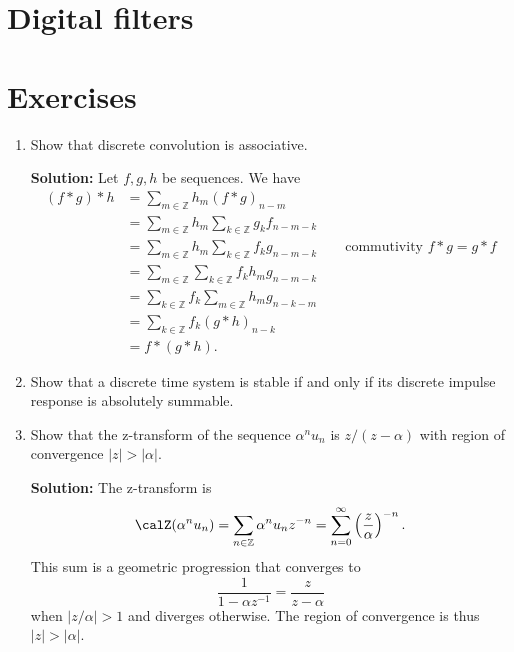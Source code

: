\documentclass[11pt,a4paper]{book}
\theoremstyle{plain}
\numberwithin{equation}{section}
\newcommand{\ints}{{\mathbb Z}}
\newcommand{\abs}[1]{\left\vert #1 \right\vert}
\newenvironment{solution}{\begin{footnotesize}\textbf{Solution:}}{\end{footnotesize}}
\newenvironment{excersizelist}{%
  \renewcommand*{\theenumi}{\thechapter.\arabic{enumi}}%
  \newcommand\itemadvanced{\stepcounter{enumi}\item[$\ast$\, \theenumi.]}
  \begin{enumerate}
}{%
  \end{enumerate}
}
\begin{document}
\section{Digital filters}




\section{Exercises}

\begin{excersizelist}


\item \label{excer:discrconvassociative} Show that discrete convolution is associative.
\begin{solution}
Let $f,g,h$ be sequences.  We have
\begin{align*}
(f*g)*h &= \sum_{m \in \ints} h_{m} (f*g)_{n-m} \\
&= \sum_{m \in \ints} h_{m} \sum_{k \in \ints} g_{k} f_{n-m-k} \\
&= \sum_{m \in \ints} h_{m} \sum_{k \in \ints} f_{k} g_{n-m-k} \qquad \text{commutivity $f*g=g*f$} \\
&= \sum_{m \in \ints} \sum_{k \in \ints} f_{k} h_m g_{n-m-k} \\
&= \sum_{k \in \ints} f_{k} \sum_{m \in \ints}  h_m g_{n-k-m} \\
&= \sum_{k \in \ints} f_{k} (g*h)_{n-k} \\
&= f*(g*h).
\end{align*}
\end{solution}

\item \label{excer:stableimpulserespdiscretetime} Show that a discrete time system is stable if and only if its discrete impulse response is absolutely summable. 


\item \label{exer:stepseqZtrans} Show that the z-transform of the sequence  $\alpha^nu_n$ is $z/(z-\alpha)$ with region of convergence $\abs{z} > \abs{\alpha}$.
\begin{solution}
The z-transform is
\[
\calZ(\alpha^nu_n) = \sum_{n \in \ints} \alpha^n u_n z^{-n} = \sum_{n=0}^\infty \left(\frac{z}{\alpha}\right)^{-n}.
\]
This sum is a geometric progression that converges to 
\[
\frac{1}{1- \alpha z^{-1}} = \frac{z}{ z-\alpha}
\]
when $\abs{z/\alpha} > 1$ and diverges otherwise.  The region of convergence is thus $\abs{z} > \abs{\alpha}$.
\end{solution}


\end{excersizelist}
\end{document}
